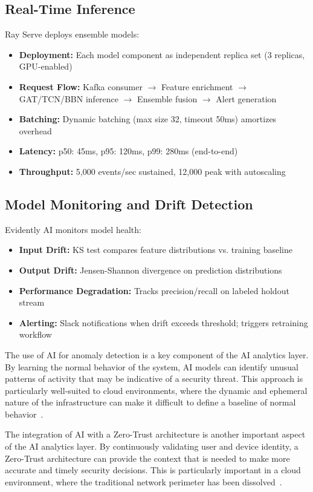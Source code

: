 \subsection{Real-Time Inference}
Ray Serve deploys ensemble models:
\begin{itemize}
    \item \textbf{Deployment:} Each model component as independent replica set (3 replicas, GPU-enabled)
    \item \textbf{Request Flow:} Kafka consumer $\rightarrow$ Feature enrichment $\rightarrow$ GAT/TCN/BBN inference $\rightarrow$ Ensemble fusion $\rightarrow$ Alert generation
    \item \textbf{Batching:} Dynamic batching (max size 32, timeout 50ms) amortizes overhead
    \item \textbf{Latency:} p50: 45ms, p95: 120ms, p99: 280ms (end-to-end)
    \item \textbf{Throughput:} 5,000 events/sec sustained, 12,000 peak with autoscaling
\end{itemize}

\subsection{Model Monitoring and Drift Detection}
Evidently AI monitors model health:
\begin{itemize}
    \item \textbf{Input Drift:} KS test compares feature distributions vs. training baseline
    \item \textbf{Output Drift:} Jensen-Shannon divergence on prediction distributions
    \item \textbf{Performance Degradation:} Tracks precision/recall on labeled holdout stream
    \item \textbf{Alerting:} Slack notifications when drift exceeds threshold; triggers retraining workflow
\end{itemize}

The use of AI for anomaly detection is a key component of the AI analytics layer. By learning the normal behavior of the system, AI models can identify unusual patterns of activity that may be indicative of a security threat. This approach is particularly well-suited to cloud environments, where the dynamic and ephemeral nature of the infrastructure can make it difficult to define a baseline of normal behavior~\cite{paloaltonetworks2024anomaly}.

The integration of AI with a Zero-Trust architecture is another important aspect of the AI analytics layer. By continuously validating user and device identity, a Zero-Trust architecture can provide the context that is needed to make more accurate and timely security decisions. This is particularly important in a cloud environment, where the traditional network perimeter has been dissolved~\cite{esrgroups2024zero}.

